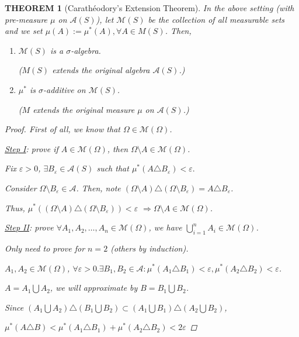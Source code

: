 \documentclass[12pt]{article}
\theoremstyle{blueplain}
\newtheorem{theorem}{THEOREM}[section]
\theoremstyle{bluedef}
\theoremstyle{blueremark}
\newcommand{\eps}{\varepsilon}
\numberwithin{equation}{section}
\begin{document}
\begin{theorem}[Carathéodory's Extension Theorem]

  In the above setting (with pre-measure $\mu$ on $\mathcal{A}(S)$), let $\mathcal{M}(S)$ be the collection of all measurable sets and we set $\mu(A) := \mu^*(A), \forall A \in M(S)$. Then,
  \begin{enumerate}
    \item $\mathcal{M}(S)$ is a $\sigma$-algebra.

          ($M(S)$ extends the original algebra $\mathcal{A}(S)$.)
    \item $\mu^*$ is $\sigma$-additive on $\mathcal{M}(S)$.

          ($M$ extends the original measure $\mu$ on $\mathcal{A}(S)$.)
  \end{enumerate}
  \begin{proof}

    First of all, we know that $\Omega \in \mathcal{M}(\Omega)$.


    \underline{Step I}: prove if $A \in \mathcal{M}(\Omega)$, then $\Omega \setminus A \in \mathcal{M}(\Omega)$.

    Fix $\eps > 0$, $\exists B_{\eps} \in \mathcal{A}(S)$ such that $\mu^*(A \triangle B_{\eps}) < \eps.$

    Consider $\Omega \setminus B_{\eps} \in \mathcal{A}$. Then, note $(\Omega \setminus A) \triangle (\Omega \setminus B_{\eps}) = A \triangle B_{\eps}$.

    Thus, $\mu^*((\Omega \setminus A) \triangle (\Omega \setminus B_{\eps})) < \eps$ $\Rightarrow \Omega \setminus A \in \mathcal{M}(\Omega)$.

    \underline{Step II}: prove $\forall A_1, A_2, \ldots, A_n \in \mathcal{M}(\Omega)$, we have $\bigcup_{i=1}^n A_i \in \mathcal{M}(\Omega)$.

    Only need to prove for $n=2$ (others by induction).

    $A_1, A_2 \in \mathcal{M}(\Omega)$, $\forall \eps > 0. \exists B_1, B_2 \in \mathcal{A}: \mu^*(A_1 \triangle B_1) < \eps, \mu^*(A_2 \triangle B_2) < \eps$.

    $A = A_1 \bigcup A_2$, we will approximate by $B = B_1 \bigcup B_2$.

    Since $(A_1 \bigcup A_2) \triangle (B_1 \bigcup B_2) \subset (A_1 \bigcup B_1) \triangle (A_2 \bigcup B_2)$,

    $\mu^*(A \triangle B) < \mu^*(A_1 \triangle B_1) + \mu^*(A_2 \triangle B_2) < 2\eps$


\end{proof}
\end{theorem}
\end{document}
